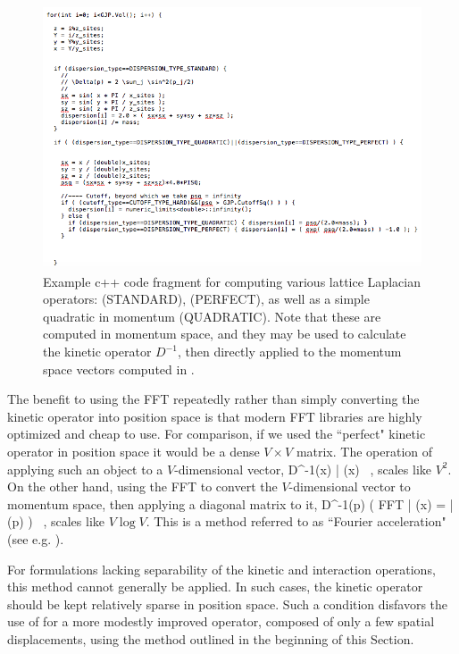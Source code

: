 \begin{figure}
\begin{center}
\includegraphics[width=\linewidth]{Chapter5-figures/dispersion}
\end{center}
\caption{\label{fig:dispersion}Example c++ code fragment for computing various lattice Laplacian operators:  (STANDARD),  (PERFECT), as well as a simple quadratic in momentum (QUADRATIC). Note that these are computed in momentum space, and they may be used to calculate the kinetic operator $D^{-1}$, then directly applied to the momentum space vectors computed in .}
\end{figure}

The benefit to using the FFT repeatedly rather than simply converting the kinetic operator into position space is that modern FFT libraries are highly optimized and cheap to use. For comparison, if we used the ``perfect" kinetic operator in position space it would be a dense $V\times V$ matrix. The operation of applying such an object to a $V$-dimensional vector,
\beq
D^{-1}(x) | \psi(x) \rangle \ ,
\eeq
scales like $V^2$. On the other hand, using the FFT to convert the $V$-dimensional vector to momentum space, then applying a diagonal matrix to it,
\beq
D^{-1}(p) \left( \mbox{FFT} | \psi(x) \rangle = | \tilde{\psi}(p) \rangle \right) \ ,
\eeq
scales like $V \log V$. This is a method referred to as ``Fourier acceleration" (see e.g. \cite{Batrouni,Daviesetal1,Daviesetal2,Katzetal1}). 

For formulations lacking separability of the kinetic and interaction operations, this method cannot generally be applied. In such cases, the kinetic operator should be kept relatively sparse in position space. Such a condition disfavors the use of  for a more modestly improved operator, composed of only a few spatial displacements, using the method outlined in the beginning of this Section.

